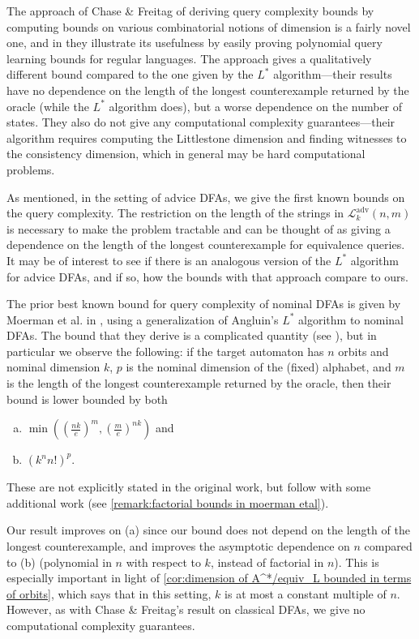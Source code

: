 \documentclass[runningheads]{llncs}
\newcommand{\mc}{\mathcal}
\begin{document}
The approach of Chase \& Freitag of deriving query complexity bounds by computing bounds on various combinatorial notions of dimension is a fairly novel one, and in \cite{chase-freitag:bounds-in-query-learning} they illustrate its usefulness by easily proving polynomial query learning bounds for regular languages. 
The approach gives a qualitatively different bound compared to the one given by the $L^*$ algorithm---their results have no dependence on the length of the longest counterexample returned by the oracle (while the $L^*$ algorithm does), but a worse dependence on the number of states. 
They also do not give any computational complexity guarantees---their algorithm requires computing the Littlestone dimension and finding witnesses to the consistency dimension, which in general may be hard computational problems.

As mentioned, in the setting of advice DFAs, we give the first known bounds on the query complexity. 
The restriction on the length of the strings in $\mc L^{\text{adv}}_k(n,m)$ is necessary to make the problem tractable and can be thought of as giving a dependence on the length of the longest counterexample for equivalence queries.
It may be of interest to see if there is an analogous version of the $L^*$ algorithm for advice DFAs, and if so, how the bounds with that approach compare to ours.

The prior best known bound for query complexity of nominal DFAs is given by Moerman et al. in \cite{moerman-etal:learning-nominal-automata}, using a generalization of Angluin's $L^*$ algorithm to nominal DFAs. The bound that they derive is a complicated quantity (see \cite[Corollary 1]{moerman-etal:learning-nominal-automata}), but in particular we observe the following: if the target automaton has $n$ orbits and nominal dimension $k$, $p$ is the nominal dimension of the (fixed) alphabet, and $m$ is the length of the longest counterexample returned by the oracle, then their bound is lower bounded by both
\begin{enumerate}[(a)]
    \item $\min\left(\left(\frac{nk}{e}\right)^m, \left(\frac{m}{e}\right)^{nk}\right)$ and 
    \item $(k^n n!)^p$.
\end{enumerate}
These are not explicitly stated in the original work, but follow with some additional work (see \autoref{remark:factorial bounds in moerman etal}).

Our result improves on (a) since our bound does not depend on the length of the longest counterexample, and improves the asymptotic dependence on $n$ compared to (b) (polynomial in $n$ with respect to $k$, instead of factorial in $n$).
This is especially important in light of \autoref{cor:dimension of A^*/equiv_L bounded in terms of orbits}, which says that in this setting, $k$ is at most a constant multiple of $n$.
However, as with Chase \& Freitag's result on classical DFAs, we give no computational complexity guarantees. 
\end{document}
